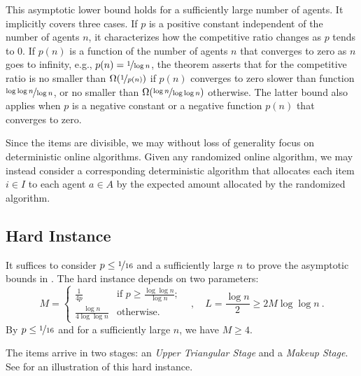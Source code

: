\documentclass[11pt,letterpaper]{article}
\begin{document}
This asymptotic lower bound holds for a sufficiently large number of agents.
It implicitly covers three cases. 
If $p$ is a positive constant independent of the number of agents $n$, it characterizes how the competitive ratio changes as $p$ tends to $0$.
If $p(n)$ is a function of the number of agents $n$ that converges to zero as $n$ goes to infinity, e.g., $p(n) = \nicefrac{1}{\log n}$, the theorem asserts that for the competitive ratio is no smaller than $\Omega(\nicefrac{1}{p(n)})$ if $p(n)$ converges to zero slower than function $\nicefrac{\log\log n}{\log n}$, or no smaller than $\Omega(\nicefrac{\log n}{\log\log n})$ otherwise.
The latter bound also applies when $p$ is a negative constant or a negative function $p(n)$ that converges to zero.










Since the items are divisible, we may without loss of generality focus on deterministic online algorithms.
Given any randomized online algorithm, we may instead consider a corresponding deterministic algorithm that allocates each item $i \in I$ to each agent $a \in A$ by the expected amount allocated by the randomized algorithm.


\subsection{Hard Instance}


It suffices to consider $p \le \nicefrac{1}{16}$ and a sufficiently large $n$ to prove the asymptotic bounds in . 
The hard instance depends on two parameters:
\[
	M =
        \begin{cases}
        \frac{1}{4p} & \mbox{if $p \geq \frac{\log\log n}{\log n}$;}\\[1ex]
        \frac{\log n}{4 \log \log n} & \mbox{otherwise.}
        \end{cases}
	\quad ,\quad
	L = \frac{\log n}{2} \ge 2M \log \log n
	~.
\]
By $p \le \nicefrac{1}{16}$ and for a sufficiently large $n$, we have $M \ge 4$.

The items arrive in two stages: an \emph{Upper Triangular Stage} and a \emph{Makeup Stage}.
See  for an illustration of this hard instance.
\end{document}
